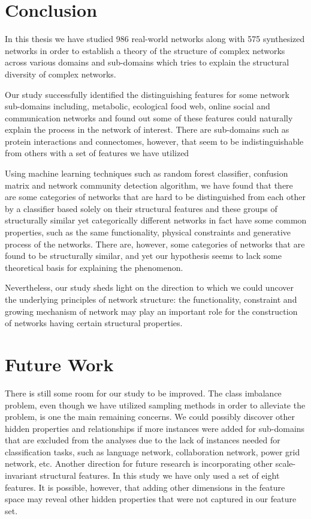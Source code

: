 \documentclass{article}
\begin{document}
 

 \section{Conclusion}
 In this thesis we have studied 986 real-world networks along with 575 synthesized networks in order to establish a  theory of the structure of complex networks across various domains and sub-domains which tries to explain the structural diversity of complex networks.
 
  Our study successfully identified the distinguishing features for some network sub-domains including, metabolic, ecological food web, online social and communication networks and found out some of these features could naturally explain the process in the network of interest. There are sub-domains such as protein interactions and connectomes, however, that seem to be indistinguishable from others with a set of features we have utilized 
  
  Using machine learning techniques such as random forest classifier, confusion matrix and network community detection algorithm, we have found that there are some categories of networks that are hard to be distinguished from each other by a classifier based solely on their structural features and these groups of structurally similar yet categorically different networks in fact have some common properties, such as the same functionality, physical constraints and generative process of the networks. There are, however, some categories of networks that are found to be structurally similar, and yet our hypothesis seems to lack some theoretical basis for explaining the phenomenon.
 
 Nevertheless, our study sheds light on the direction to which we could uncover the underlying principles of network structure: the functionality, constraint and growing mechanism of network may play an important role for the construction of networks having certain structural properties.
 
 

\section{Future Work}
There is still some room for our study to be improved. The class imbalance problem, even though we have utilized sampling methods in order to alleviate the problem, is one the main remaining concerns.  We could possibly discover other hidden properties and relationships if more instances were added for sub-domains that are excluded from the analyses due to the lack of instances needed for classification tasks, such as language network, collaboration network, power grid network, etc. Another direction for future research is incorporating other scale-invariant structural features. In this study we have only used a set of eight features. It is possible, however, that adding other dimensions in the feature space may reveal other hidden properties that were not captured in our feature set. 
\end{document}
